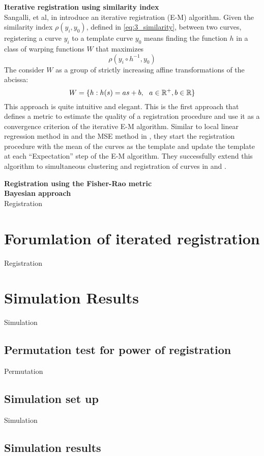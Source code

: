 \noindent
{\bf{Iterative registration using similarity index}} \\
Sangalli, et al, in \cite{Sangalli_etal_2009_JASA} introduce an iterative registration (E-M) algorithm. Given the similarity index $\rho(y_i, y_0)$, defined in \ref{eq:3_similarity}, between two curves, registering a curve $y_i$ to a template curve $y_0$ means finding the function $h$ in a class of warping functions $W$ that maximizes 
\[ \rho(y_i \circ h^{-1}, y_0)\]
The consider $W$ as a group of strictly increasing affine transformations of the abcissa:
\begin{equation}
W = \{h:h(s) = as + b,\ \ a \in \mathbb{R}^{+}, b \in \mathbb{R}  \}
\label{eq:3_affine}
\end{equation}
This approach is quite intuitive and elegant. This is the first approach that defines a metric to estimate the quality of a registration procedure and use it as a convergence criterion of the iterative E-M algorithm. Similar to local linear regression method in \cite{Kneip_etal_2000_CJS} and the MSE method in \cite{Ramsay_2006_Functional}, they start the registration procedure with the mean of the curves as the template and update the template at each ``Expectation'' step of the E-M algorithm. They successfully extend this algorithm to simultaneous clustering and registration of curves in \cite{Sangalli_etal_2010_CSDA} and \cite{Sangalli_etal_2014_EJS}. 

\noindent
{\bf{Registration using the Fisher-Rao metric}} \\

\noindent
{\bf{Bayesian approach}} \\
Registration

\section{Forumlation of iterated registration}
Registration

\section{Simulation Results}
Simulation
\subsection{Permutation test for power of registration}
Permutation
\subsection{Simulation set up}
Simulation
\subsection{Simulation results}



